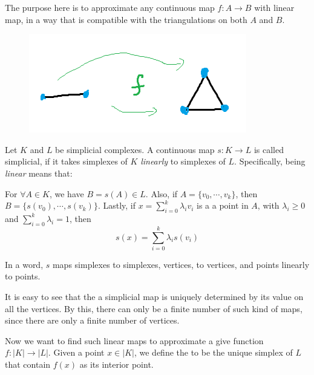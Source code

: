 The purpose here is to approximate any continuous map $f:A\to B$ with
linear map, in a way that is compatible with the triangulations on
both $A$ and $B$.
\begin{figure}[H]
    \centering
    \includegraphics[width=0.4\linewidth]{pics/ch6-notes-2/exp2.png}
\end{figure}
\begin{defi}
    Let $K$ and $L$ be simplicial complexes. A continuous map $s:K\to
    L$ is called simplicial, if it takes simplexes of $K$
    \textit{linearly} to simplexes of $L$. Specifically, being
    \textit{linear} means that:
    
    For $\forall A\in K$, we have $B=s(A)\in L$. Also, if
    $A=\{v_0,\cdots,v_k\}$, then $B=\{s(v_0),\cdots,s(v_k)\}$.
    Lastly, if $x=\sum_{i=0}^k \lambda_i v_i$ is a a point in $A$, with
    $\lambda_i\geq 0$ and $\sum_{i=0}^k\lambda_i=1$, then
    $$s(x) = \sum_{i=0}^k \lambda_i s(v_i)$$

    In a word, $s$ maps simplexes to simplexes, vertices, to vertices,
    and points linearly to points.
\end{defi}
\begin{remark}
    It is easy to see that the a simplicial map is uniquely determined
    by its value on all the vertices. By this, there can only be a
    finite number of such kind of maps, since there are only a finite
    number of vertices.
\end{remark}

Now we want to find such linear maps to approximate a give function
$f:|K|\to |L|$. Given a point $x\in |K|$, we define the
 to be the unique simplex of $L$ that contain
$f(x)$ as its interior point.

